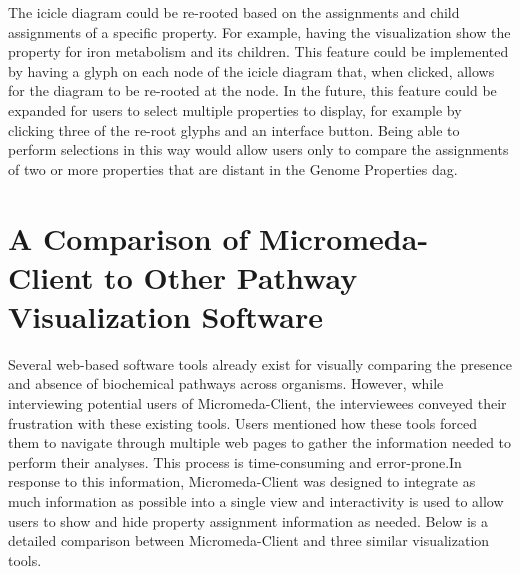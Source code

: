 The icicle diagram could be re-rooted based on the assignments and child 
assignments of a specific property. For example, having the visualization show 
the property for iron metabolism and its children. This feature could be 
implemented by having a glyph on each node of the icicle diagram that, when 
clicked, allows for the diagram to be re-rooted at the node. In the future, this 
feature could be expanded for users to select multiple properties to display, 
for example by clicking three of the re-root glyphs and an interface button. Being 
able to perform selections in this way would allow users only to compare the 
assignments of two or more properties that are distant in the Genome Properties 
\gls{dag}.

\section{A Comparison of Micromeda-Client to Other Pathway Visualization 
Software} \label{visualization-comparison}

Several web-based software tools already exist for visually comparing the 
presence and absence of biochemical pathways across organisms. However, while 
interviewing potential users of Micromeda-Client, the interviewees conveyed 
their frustration with these existing tools. Users mentioned how these tools 
forced them to navigate through multiple web pages to gather the information 
needed to perform their analyses. This process is time-consuming and 
error-prone.In response to this information, Micromeda-Client was designed to 
integrate as much information as possible into a single view and interactivity 
is used to allow users to show and hide property assignment information as 
needed. Below is a detailed comparison between Micromeda-Client and three 
similar visualization tools.

